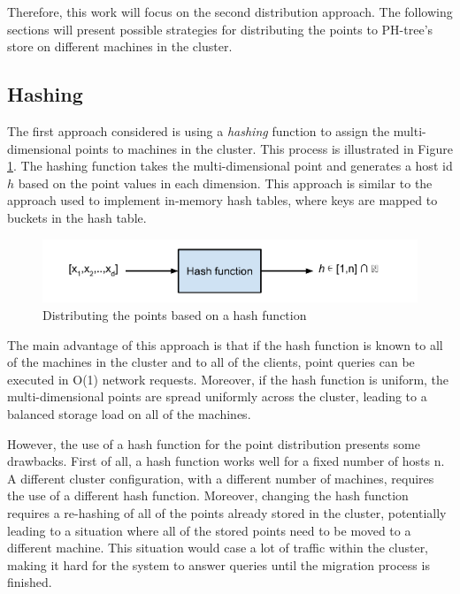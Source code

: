 \documentclass[11pt,a4paper]{globis-book}
\begin{document}
Therefore, this work will focus on the second distribution approach. The following sections will present possible strategies for distributing the points to PH-tree's store on different machines in the cluster.  

\subsection{Hashing}

The first approach considered is using a \textit{hashing} function to assign the multi-dimensional points to machines in the cluster. This process is illustrated in Figure \ref{fig:hashing}. The hashing function takes the multi-dimensional point and generates a host id $h$ based on the point values in each dimension. This approach is similar to the approach used to implement in-memory hash tables, where keys are mapped to buckets in the hash table.

\begin{figure}[h]
    \centering 
    \includegraphics[scale=0.9]{images/hashing}
    \caption{Distributing the points based on a hash function}
    \label{fig:hashing}
\end{figure}

The main advantage of this approach is that if the hash function is known to all of the machines in the cluster and to all of the clients, point queries can be executed in O(1) network requests. Moreover, if the hash function is uniform, the multi-dimensional points are spread uniformly across the cluster, leading to a balanced storage load on all of the machines.

However, the use of a hash function for the point distribution presents some drawbacks. First of all, a hash function works well for a fixed number of hosts n. A different cluster configuration, with a different number of machines, requires the use of a different hash function. Moreover, changing the hash function requires a re-hashing of all of the points already stored in the cluster, potentially leading to a situation where all of the stored points need to be moved to a different machine. This situation would case a lot of traffic within the cluster, making it hard for the system to answer queries until the migration process is finished.
\end{document}
